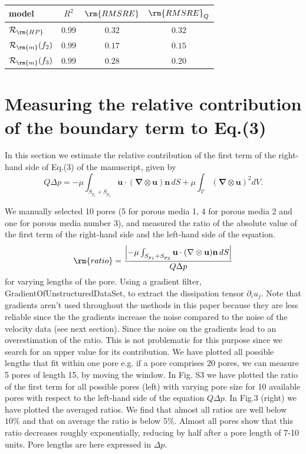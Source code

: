 \documentclass[draft,jgrga]{agutexSI2019}
\begin{document}
\begin{article}
\vspace{1cm}
\\
\begin{tabular}{l|c|c|c}
\hline
model & $R^2$  & $\rm{RMSRE}$ & $\rm{RMSRE}_Q$  \\
\hline
$\mathcal{R}_{\rm{HP}}$ 	& $0.99$ & $0.32$ & $0.32$\\
$\mathcal{R}_{\rm{m}}(f_2)$	& $0.99$ & $0.17$ & $0.15$\\
$\mathcal{R}_{\rm{m}}(f_3)$	& $0.99$ & $0.28$ & $0.20$\\
\end{tabular}


\section{Measuring the relative contribution of the boundary term to Eq.(3)} 

In this section we estimate the relative contribution of the first term of the right-hand side of Eq.(3) of the manuscript, given by
\begin{equation}
	Q \Delta p = -\mu\int_{S_{p_1}+S_{p_2}} \mathbf{u}\cdot (\mathbf{\nabla}\otimes \mathbf{u})\mathbf{n}\,dS +\mu \int_{\mathcal{V}} (\mathbf{\nabla}\otimes \mathbf{u})^2 dV. \label{eq:pressuredrop}
\end{equation}

We manually selected 10 pores (5 for porous media 1, 4 for porous media 2 and one for porous media number 3), and measured the ratio of the absolute value of the first term  of the right-hand side and the left-hand side of the equation.
\begin{equation}
	\rm{ratio} =  \frac{\left|-\mu\int_{S_{p_1}+S_{p_2}} \mathbf{u}\cdot (\mathbf{\nabla}\otimes \mathbf{u})\mathbf{n}\,dS \right|}{Q\Delta p}
\end{equation}
 for varying lengths of the pore. Using a gradient filter, GradientOfUnstructuredDataSet, to extract the dissipation tensor $\partial_iu_j$. Note that gradients aren't used throughout the methods in this paper because they are less reliable since the the gradients increase the noise compared to the noise of the velocity data (see next section). Since the noise on the gradients lead to an overestimation of the ratio. This is not problematic for this purpose since we search for an upper value for its contribution. We have plotted all possible lengths that fit within one pore e.g. if a pore comprises 20 pores, we can measure 5 pores of length 15, by moving the window. In Fig. S3 we have plotted the ratio of the first term for all possible pores (left) with varying pore size for 10 available pores with respect to the left-hand side of the equation $Q\Delta p $. In Fig.3 (right) we have plotted the averaged ratios. We find that almost all ratios are well below $10\%$ and that on average the ratio is below $5\%$. Almost all pores show that this ratio decreases roughly exponentially, reducing by half after a pore length of 7-10 units. Pore lengths are here expressed in $\Delta p$. 




\end{article}
\end{document}
